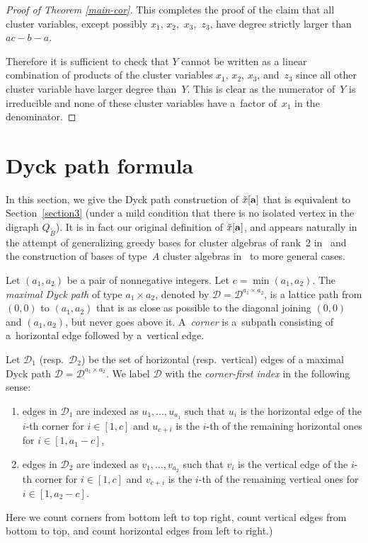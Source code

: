 \documentclass[pdftex]{sigma}
\numberwithin{equation}{section}
\begin{document}
\begin{proof}[Proof of Theorem \ref{main-cor}]
This completes the proof of the claim that all cluster variables, except possibly $x_1$, $x_2$,~$x_3$,~$z_3$, have degree strictly larger than $ac-b-a$.

Therefore it is suf\/f\/icient to check that $Y$ cannot be written as a linear combination of products of the cluster variables $x_1$, $x_2$, $x_3$, and~$z_3$ since all other cluster variable have larger degree than~$Y$. This is clear as the numerator of~$Y$ is irreducible and none of these cluster variables have a~factor of~$x_1$ in the denominator.
\end{proof}



\section{Dyck path formula}\label{section5}

 In this section, we give the Dyck path construction of $\tilde{x}[{\bf a}]$ that is equivalent to Section~\ref{section3} (under a mild condition that there is no isolated vertex in the digraph $Q_{\tilde B}$). It is in fact our original def\/inition of $\tilde{x}[{\bf a}]$, and appears naturally in the attempt of  generalizing greedy bases for cluster algebras of rank~2 in~\cite{LLZ} and the construction of bases of type~$A$ cluster algebras in~\cite{B9} to more general cases.


Let $(a_1, a_2)$ be a pair of nonnegative integers. Let $c=\min(a_1,a_2)$.
The \emph{maximal Dyck path} of type $a_1\times a_2$, denoted by $\mathcal{D}=\mathcal{D}^{a_1\times a_2}$, is a lattice path
from $(0, 0)$  to $(a_1,a_2)$ that is as close as possible to the diagonal joining $(0,0)$ and $(a_1,a_2)$, but never goes above it. A~\emph{corner} is a~subpath consisting of a~horizontal edge followed by a~vertical edge.


\begin{Definition}\label{corner-first}
Let $\mathcal{D}_1$ (resp.~$\mathcal{D}_2$) be the set of horizontal (resp.~vertical) edges of a maximal Dyck path $\mathcal{D}=\mathcal{D}^{a_1\times a_2}$. We label $\mathcal{D}$ with the \emph{corner-first index} in the following sense:
\begin{enumerate}\itemsep=0pt
\item[(a)] edges in $\mathcal{D}_1$ are indexed as $u_1,\dots,u_{a_1}$ such that $u_i$ is the horizontal edge of the $i$-th corner for $i\in [1,c]$ and $u_{c+i}$ is the $i$-th of the remaining horizontal ones for $i\in [1, a_1-c]$,

\item[(b)] edges in $\mathcal{D}_2$ are indexed as $v_1,\dots, v_{a_2}$ such that $v_i$ is the vertical edge of the $i$-th corner for $i\in [1,c]$ and $v_{c+i}$ is the $i$-th  of the remaining vertical ones for $i\in [1, a_2-c]$.
\end{enumerate}
 Here we count corners from bottom left to top right, count vertical edges from bottom to top, and count horizontal edges from left to right.)
\end{Definition}
\end{document}
